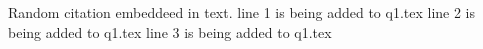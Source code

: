 \documentclass{article}
\begin{document}
Random citation \cite{DUMMY:1} embeddeed in text.
line 1 is being added to q1.tex
line 2 is being added to q1.tex
line 3 is being added to q1.tex

\newpage

 

\end{document}
